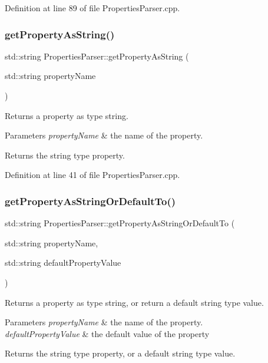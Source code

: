 Definition at line 89 of file Properties\+Parser.\+cpp.

\mbox{\label{class_properties_parser_a8566ea176851c43e244ea291eb5968e5}} 
\subsubsection{get\+Property\+As\+String()}
{\footnotesize\ttfamily std\+::string Properties\+Parser\+::get\+Property\+As\+String (\begin{DoxyParamCaption}\item[{std\+::string}]{property\+Name }\end{DoxyParamCaption})}

Returns a property as type string. 
\begin{DoxyParams}{Parameters}
{\em property\+Name} & the name of the property. \\
\hline
\end{DoxyParams}
\begin{DoxyReturn}{Returns}
the string type property. 
\end{DoxyReturn}


Definition at line 41 of file Properties\+Parser.\+cpp.

\mbox{\label{class_properties_parser_abc496cea92a4d563710e11f85f2dc957}} 
\subsubsection{get\+Property\+As\+String\+Or\+Default\+To()}
{\footnotesize\ttfamily std\+::string Properties\+Parser\+::get\+Property\+As\+String\+Or\+Default\+To (\begin{DoxyParamCaption}\item[{std\+::string}]{property\+Name,  }\item[{std\+::string}]{default\+Property\+Value }\end{DoxyParamCaption})}

Returns a property as type string, or return a default string type value. 
\begin{DoxyParams}{Parameters}
{\em property\+Name} & the name of the property. \\
\hline
{\em default\+Property\+Value} & the default value of the property \\
\hline
\end{DoxyParams}
\begin{DoxyReturn}{Returns}
the string type property, or a default string type value. 
\end{DoxyReturn}


